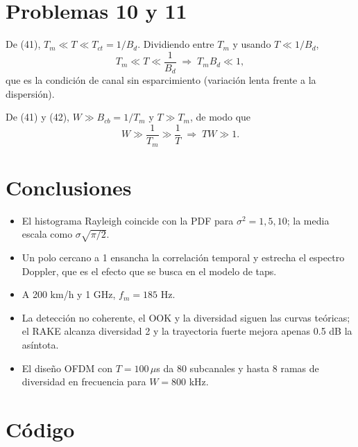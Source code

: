\documentclass[11pt,a4paper]{article}
\newcommand{\listado}[1]{%
  \VerbatimInput[fontsize=\scriptsize,breaklines=true,breakanywhere=true,
    frame=single,framesep=2pt,rulecolor=\color{gray!50},numbers=left,
    numbersep=4pt]{#1}}
\begin{document}
\section*{Problemas 10 y 11}

De (41), $T_m\ll T\ll T_{ct}=1/B_d$. Dividiendo entre $T_m$ y usando
$T\ll1/B_d$,
\begin{equation}
  T_m\ll T\ll \frac{1}{B_d}\;\Longrightarrow\;T_mB_d\ll1 ,
\end{equation}
que es la condición de canal sin esparcimiento (variación lenta frente a la
dispersión).

De (41) y (42), $W\gg B_{cb}=1/T_m$ y $T\gg T_m$, de modo que
\begin{equation}
  W\gg\frac{1}{T_m}\gg\frac{1}{T}\;\Longrightarrow\;TW\gg1 .
\end{equation}

\section*{Conclusiones}

\begin{itemize}
  \item El histograma Rayleigh coincide con la PDF para $\sigma^2=1,5,10$;
        la media escala como $\sigma\sqrt{\pi/2}$.
  \item Un polo cercano a 1 ensancha la correlación temporal y estrecha el
        espectro Doppler, que es el efecto que se busca en el modelo de taps.
  \item A 200 km/h y 1 GHz, $f_m=185$ Hz.
  \item La detección no coherente, el OOK y la diversidad siguen las curvas
        teóricas; el RAKE alcanza diversidad 2 y la trayectoria fuerte mejora
        apenas 0.5 dB la asíntota.
  \item El diseño OFDM con $T=100\,\mu$s da 80 subcanales y hasta 8 ramas de
        diversidad en frecuencia para $W=800$ kHz.
\end{itemize}

\appendix
\section*{Código}
\listado{tarea1.py}
\end{document}
